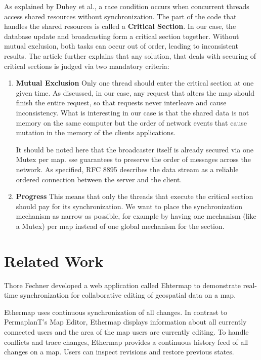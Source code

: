 \documentclass[final,oneside]{vutinfth}
\begin{document}
As explained by Dubey et al.\cite{artice_race_condition_and_dynamic_data_race_detection}, a race condition occurs when concurrent threads access shared resources without synchronization.
The part of the code that handles the shared resources is called a \textbf{Critical Section}.
In our case, the database update and broadcasting form a critical section together.
Without mutual exclusion, both tasks can occur out of order, leading to inconsistent results.
The article \cite{artice_race_condition_and_dynamic_data_race_detection} further explains that any solution, that deals with securing of critical sections is judged via two mandatory criteria: 
\begin{enumerate}
    \item \textbf{Mutual Exclusion}
    Only one thread should enter the critical section at one given time.
    As discussed, in our case, any request that alters the map should finish the entire request, so that requests never interleave and cause inconsistency.
    What is interesting in our case is that the shared data is not memory on the same computer but the order of network events that cause mutation in the memory of the clients applications.

    It should be noted here that the broadcaster itself is already secured via one Mutex per map.
    \gls{sse} guarantees to preserve the order of messages across the network.
    As specified, RFC 8895 \cite{rfc8895sse} describes the data stream as a reliable ordered connection between the server and the client.
    
    \item \textbf{Progress}
    This means that only the threads that execute the critical section should pay for its synchronization.
    We want to place the synchronization mechanism as narrow as possible, for example by having one mechanism (like a Mutex) per map instead of one global mechanism for the section.
\end{enumerate}

\chapter{Related Work}

Thore Fechner developed a web application called Ehtermap to demonstrate real-time synchronization for collaborative editing of geospatial data on a map\cite{ethermap}.

Ethermap uses continuous synchronization of all changes.
In contrast to PermaplanT's Map Editor, Ethermap displays information about all currently connected users and the area of the map users are currently editing.
To handle conflicts and trace changes, Ethermap provides a continuous history feed of all changes on a map.
Users can inspect revisions and restore previous states.
\end{document}
